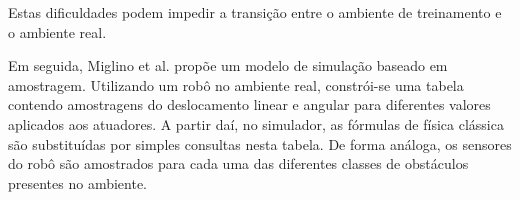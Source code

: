 Estas dificuldades podem impedir a transição entre o ambiente de treinamento e o ambiente real.

Em seguida, Miglino et al. \cite{miglino96evolving} propõe um modelo de simulação baseado em amostragem. Utilizando um robô no ambiente real, constrói-se uma tabela contendo amostragens do deslocamento linear e angular para diferentes valores aplicados aos atuadores. A partir daí, no simulador, as fórmulas de física clássica são substituídas por simples consultas nesta tabela. De forma análoga, os sensores do robô são amostrados para cada uma das diferentes classes de obstáculos presentes no ambiente.